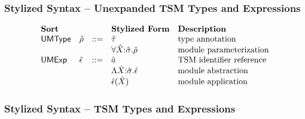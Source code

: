 \subsubsection{Stylized Syntax -- Unexpanded TSM Types and Expressions}
\[\begin{array}{lllllll}
\textbf{Sort} & & 
& \textbf{Stylized Form} 
& \textbf{Description}\\
\mathsf{UMType} & \urho & ::= 
& \utau & \text{type annotation}\\
&&
& \allmods{\uX}{\usigma}{\urho} & \text{module parameterization}\\
\mathsf{UMExp} & \uepsilon & ::= 
& \tsmv & \text{TSM identifier reference}\\
&&
& \absmod{\uX}{\usigma}{\uepsilon} & \text{module abstraction}\\
&&
& \apmod{\uepsilon}{\uX} & \text{module application}%
\end{array}
\]

\subsubsection{Stylized Syntax -- TSM Types and Expressions}

